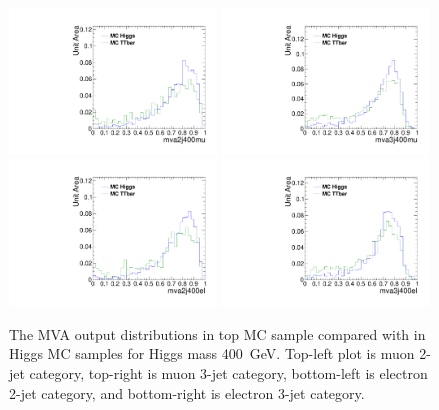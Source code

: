 \begin{figure}[!t]
  \centering
  \includegraphics[width=0.49\textwidth]{figs/cl-mva2j400mu-mvaTopvsHiggs.pdf}
  \includegraphics[width=0.49\textwidth]{figs/cl-mva3j400mu-mvaTopvsHiggs.pdf}
  \includegraphics[width=0.49\textwidth]{figs/cl-mva2j400el-mvaTopvsHiggs.pdf}
  \includegraphics[width=0.49\textwidth]{figs/cl-mva3j400el-mvaTopvsHiggs.pdf}
  \caption{\label{fig:mva:sigvsttbar-mva2j400}The MVA output
    distributions in top MC sample compared with in Higgs MC
    samples for Higgs mass 400~GeV. Top-left plot is muon 2-jet category,
    top-right is muon 3-jet category, bottom-left is electron 2-jet
    category, and bottom-right is electron 3-jet category. }
\end{figure}

